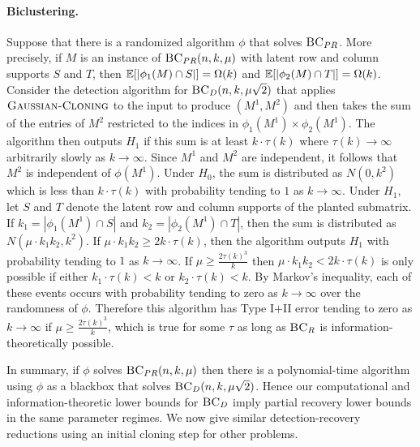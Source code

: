 \paragraph{Biclustering.} Suppose that there is a randomized algorithm $\phi$ that solves $\textsc{BC}_{PR}$. More precisely, if $M$ is an instance of $\textsc{BC}_{PR}(n, k, \mu)$ with latent row and column supports $S$ and $T$, then $\mathbb{E}[|\phi_1(M) \cap S|] = \Omega(k)$ and $\mathbb{E}[|\phi_2(M) \cap T|] = \Omega(k)$. Consider the detection algorithm for $\textsc{BC}_{D}(n, k, \mu \sqrt{2})$ that applies $\textsc{Gaussian-Cloning}$ to the input to produce $(M^1, M^2)$ and then takes the sum of the entries of $M^2$ restricted to the indices in $\phi_1(M^1) \times \phi_2(M^1)$. The algorithm then outputs $H_1$ if this sum is at least $k \cdot \tau(k)$ where $\tau(k) \to \infty$ arbitrarily slowly as $k \to \infty$. Since $M^1$ and $M^2$ are independent, it follows that $M^2$ is independent of $\phi(M^1)$. Under $H_0$, the sum is distributed as $N(0, k^2)$ which is less than $k \cdot \tau(k)$ with probability tending to $1$ as $k \to \infty$. Under $H_1$, let $S$ and $T$ denote the latent row and column supports of the planted submatrix. If $k_1 = |\phi_1(M^1) \cap S|$ and $k_2 = |\phi_2(M^1) \cap T|$, then the sum is distributed as $N(\mu \cdot k_1 k_2, k^2)$. If $\mu \cdot k_1 k_2 \ge 2k \cdot \tau(k)$, then the algorithm outputs $H_1$ with probability tending to $1$ as $k \to \infty$. If $\mu \ge \frac{2\tau(k)^3}{k}$ then $\mu \cdot k_1 k_2 < 2k \cdot \tau(k)$ is only possible if either $k_1 \cdot \tau(k) < k$ or $k_2 \cdot \tau(k) < k$. By Markov's inequality, each of these events occurs with probability tending to zero as $k \to \infty$ over the randomness of $\phi$. Therefore this algorithm has Type I$+$II error tending to zero as $k \to \infty$ if $\mu \ge \frac{2\tau(k)^3}{k}$, which is true for some $\tau$ as long as $\textsc{BC}_R$ is information-theoretically possible.

In summary, if $\phi$ solves $\textsc{BC}_{PR}(n, k, \mu)$ then there is a polynomial-time algorithm using $\phi$ as a blackbox that solves $\textsc{BC}_{D}(n, k, \mu \sqrt{2})$. Hence our computational and information-theoretic lower bounds for $\textsc{BC}_D$ imply partial recovery lower bounds in the same parameter regimes. We now give similar detection-recovery reductions using an initial cloning step for other problems.

